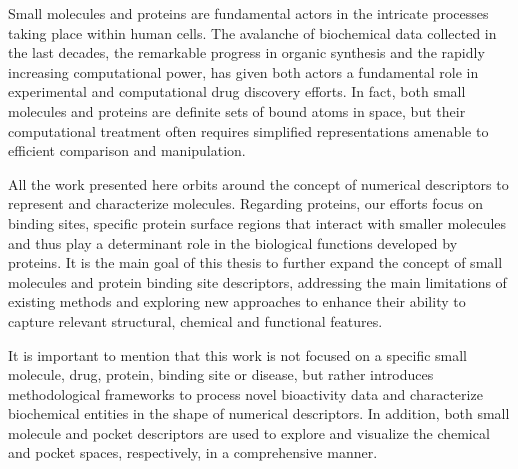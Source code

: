 Small molecules and proteins are fundamental actors in the intricate processes taking place within human cells. The avalanche of biochemical data collected in the last decades, the remarkable progress in organic synthesis and the rapidly increasing computational power, has given both actors a fundamental role in experimental and computational drug discovery efforts. In fact, both small molecules and proteins are definite sets of bound atoms in space, but their computational treatment often requires simplified representations amenable to efficient comparison and manipulation. 

All the work presented here orbits around the concept of numerical descriptors to represent and characterize molecules. Regarding proteins, our efforts focus on binding sites, specific protein surface regions that interact with smaller molecules and thus play a determinant role in the biological functions developed by proteins. It is the main goal of this thesis to further expand the concept of small molecules and protein binding site descriptors, addressing the main limitations of existing methods and exploring new approaches to enhance their ability to capture relevant structural, chemical and functional features. 

It is important to mention that this work is not focused on a specific small molecule, drug, protein, binding site or disease, but rather introduces methodological frameworks to process novel bioactivity data and characterize biochemical entities in the shape of numerical descriptors. In addition, both small molecule and pocket descriptors are used to explore and visualize the chemical and pocket spaces, respectively, in a comprehensive manner. 


